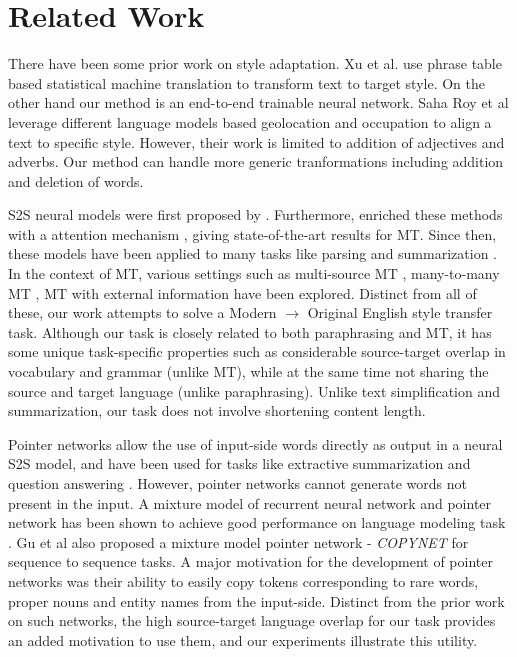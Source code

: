
\section{Related Work} \label{sec:RelatedWord}

There have been some prior work on style adaptation. Xu et al.  use phrase table based statistical machine translation to transform text to target style.  %
On the other hand our method is an end-to-end trainable neural network.
Saha Roy et al  leverage different language models based geolocation and occupation to align a text to specific style. However, their work is limited to addition of adjectives and adverbs. Our method can handle more generic tranformations including addition and deletion of words.

S2S neural models were first proposed by \cite{sutskever2014sequence}. Furthermore, \cite{bahdanau2014neural} enriched these methods with a attention mechanism , giving state-of-the-art results for MT. Since then, these models have been applied to many tasks like parsing \cite{vinyals2015pointer} and summarization \cite{rush2015neural}. In the context of MT, various settings such as multi-source MT \cite{zoph2016multi}, many-to-many MT \cite{johnson2016google}, MT with external information \cite{sennrich2016controlling} have been explored. Distinct from all of these, our work attempts to solve a Modern $\rightarrow$ Original English style transfer task. Although our task is closely related to both paraphrasing and MT, it has some unique task-specific properties such as considerable source-target overlap in vocabulary and grammar (unlike MT), while at the same time not sharing the source and target language (unlike paraphrasing). Unlike text simplification and summarization, our task does not involve shortening content length. 

Pointer networks \cite{vinyals2015pointer} allow the use of input-side words directly as output in a neural S2S model, and have been used for tasks like extractive summarization \cite{see2017get} \cite{zeng2016efficient}  and question answering \cite{wang2016machine}. However, pointer networks cannot generate words not present in the input. A mixture model of recurrent neural network and pointer network has been shown to achieve good performance on language modeling task \cite{merity2016pointer}. Gu et al  also proposed a mixture model pointer network - \textit{COPYNET} for sequence to sequence tasks. A major motivation for the development of pointer networks was their ability to easily copy tokens corresponding to rare words, proper nouns and entity names from the input-side. Distinct from the prior work on such networks, the high source-target language overlap for our task provides an added motivation to use them, and our experiments illustrate this utility.

